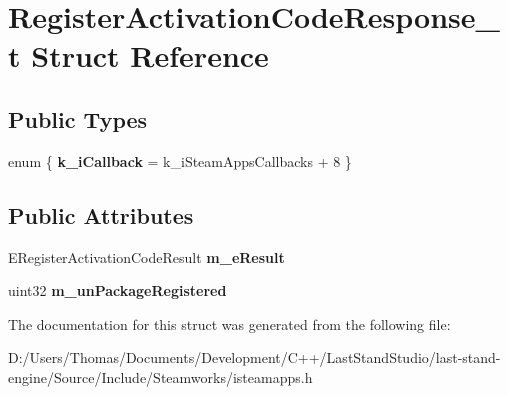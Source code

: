 \hypertarget{structRegisterActivationCodeResponse__t}{}\section{Register\+Activation\+Code\+Response\+\_\+t Struct Reference}
\label{structRegisterActivationCodeResponse__t}
\subsection*{Public Types}
\begin{DoxyCompactItemize}
\item 
\hypertarget{structRegisterActivationCodeResponse__t_a6a5fc21b558694ed7003fd62f51601c6}{}enum \{ {\bfseries k\+\_\+i\+Callback} = k\+\_\+i\+Steam\+Apps\+Callbacks + 8
 \}\label{structRegisterActivationCodeResponse__t_a6a5fc21b558694ed7003fd62f51601c6}

\end{DoxyCompactItemize}
\subsection*{Public Attributes}
\begin{DoxyCompactItemize}
\item 
\hypertarget{structRegisterActivationCodeResponse__t_a9f94348fd421e0f5bfbff9a46432e1aa}{}E\+Register\+Activation\+Code\+Result {\bfseries m\+\_\+e\+Result}\label{structRegisterActivationCodeResponse__t_a9f94348fd421e0f5bfbff9a46432e1aa}

\item 
\hypertarget{structRegisterActivationCodeResponse__t_af7cb64c43cd2463403e507a7edc74b6d}{}uint32 {\bfseries m\+\_\+un\+Package\+Registered}\label{structRegisterActivationCodeResponse__t_af7cb64c43cd2463403e507a7edc74b6d}

\end{DoxyCompactItemize}


The documentation for this struct was generated from the following file\+:\begin{DoxyCompactItemize}
\item 
D\+:/\+Users/\+Thomas/\+Documents/\+Development/\+C++/\+Last\+Stand\+Studio/last-\/stand-\/engine/\+Source/\+Include/\+Steamworks/isteamapps.\+h\end{DoxyCompactItemize}
